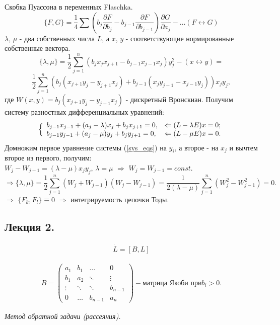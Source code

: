 \documentclass[a4paper,12pt]{article}
\theoremstyle{definition}
\theoremstyle{definition}
\theoremstyle{definition}
\newcommand{\bear}[1]{\begin{eqnarray}\label{#1}}
\newcommand{\ear}{\end{eqnarray}}
\begin{document}
Скобка Пуассона в переменных Flaschka.
\[\{F,G\} = \frac 14 \sum \left(b_{j}\frac{\partial F}{\partial b_{j}} - b_{j-1}\frac{\partial F}{\partial b_{j-1}}\right)\frac{\partial G}{\partial a_{j}} - \ldots (F\leftrightarrow G)\]
$\lambda$, $\mu$ - два собственных числа $L$, а $x$, $y$ - соответствующие  нормированные собственные вектора.
\[\{\lambda, \mu\} = \frac 12  \sum^{n}_{j=1}\left(b_{j}x_{j}x_{j+1} - b_{j-1}x_{j-1}x_{j}\right)y^{2}_{j} - (x\leftrightarrow y) =\]
\[\frac12 \sum^{n}_{j=1} \left(b_{j}(x_{j+1}y_{j} - y_{j+1}x_{j}) + b_{j-1}(x_{j}y_{j-1} - x_{j-1}y_{j}) \right) x_{j}y_{j},\]
где $W(x,y) = b_{j}(x_{j+1}y_{j} - y_{j+1}x_{j}) $ - дискретный Вронскиан.
Получим систему разностных дифференциальных уравнений:
\bear{sys_eqs}\Bigl\{
    \begin{array}{ll}
      b_{j-1}x_{j-1} + (a_{j} - \lambda)x_{j} + b_{j}x_{j+1} = 0 \textrm{,} & \Leftarrow (L-\lambda E)x =0\textrm{;} \\
      b_{j-1}y_{j-1} + (a_{j} - \mu)y_{j} + b_{j}y_{j+1} = 0 \textrm{,} & \Leftarrow (L-\mu E)x =0 \textrm{.}
    \end{array}
\ear
Домножим первое уравнение системы (\ref{sys_eqs}) на $y_{i}$, а второе - на $x_{j}$ и вычтем второе из первого, получим:\\
$W_{j} - W_{j-1} = (\lambda - \mu)x_{j}y_{j}$, $\lambda = \mu$ $\Rightarrow$ $W_{j} = W_{j-1} = const$.\\
\[\Rightarrow \{\lambda, \mu\} = \frac 12 \sum^{n}_{j=1} \left(W_{j} + W_{j-1}\right)\left(W_{j}  - W_{j-1}\right) = \frac{1}{2(\lambda - \mu)}\sum^{n}_{j=1}\left(W^{2}_{j} - W^{2}_{j-1}\right) =0.\]
$\Rightarrow$ $\{F_{k}, F_{l}\} \equiv 0$ $\Rightarrow$  интегрируемость цепочки Тоды.\\

\subsection{Лекция 2.}
\bear{LP}
\dot{L} = [B,L]
\ear

\bear{matrice_L}
B =
\left( \begin{array}{cccc}
a_{1}& b_{1} &\ldots & 0\\
b_{1}& a_{2} &\ddots & \vdots\\
\vdots & \ddots &\ddots & b_{n-1}\\
0& \ldots & b_{n-1}  & a_{n}
\end{array}
\right)  - \textrm{матрица Якоби при} b_{i}>0.
\ear

\textit{Метод обратной задачи (рассеяния).}\\
\end{document}

